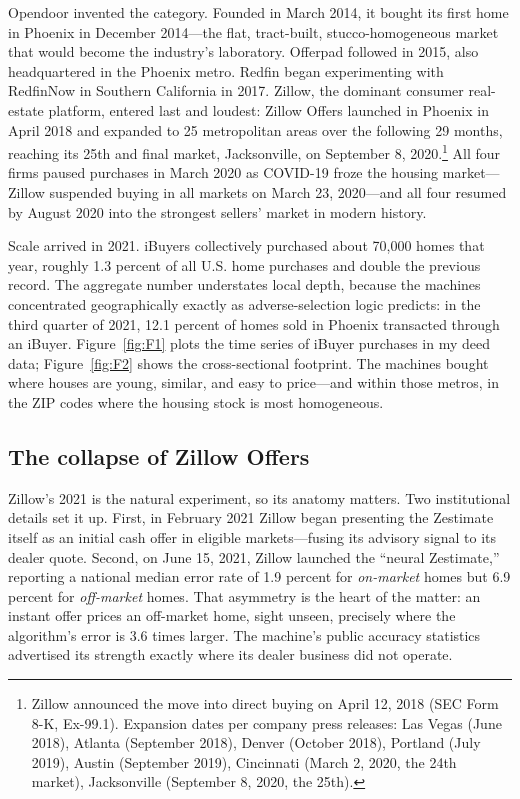 \documentclass[12pt, letterpaper]{article}
\theoremstyle{remark}
\begin{document}
Opendoor invented the category. Founded in March 2014, it bought its first home in Phoenix in December 2014---the flat, tract-built, stucco-homogeneous market that would become the industry's laboratory. Offerpad followed in 2015, also headquartered in the Phoenix metro. Redfin began experimenting with RedfinNow in Southern California in 2017. Zillow, the dominant consumer real-estate platform, entered last and loudest: Zillow Offers launched in Phoenix in April 2018 and expanded to 25 metropolitan areas over the following 29 months, reaching its 25th and final market, Jacksonville, on September 8, 2020.\footnote{Zillow announced the move into direct buying on April 12, 2018 (SEC Form 8-K, Ex-99.1). Expansion dates per company press releases: Las Vegas (June 2018), Atlanta (September 2018), Denver (October 2018), Portland (July 2019), Austin (September 2019), Cincinnati (March 2, 2020, the 24th market), Jacksonville (September 8, 2020, the 25th).} All four firms paused purchases in March 2020 as COVID-19 froze the housing market---Zillow suspended buying in all markets on March 23, 2020---and all four resumed by August 2020 into the strongest sellers' market in modern history.

Scale arrived in 2021. iBuyers collectively purchased about 70{,}000 homes that year, roughly 1.3 percent of all U.S. home purchases and double the previous record. The aggregate number understates local depth, because the machines concentrated geographically exactly as adverse-selection logic predicts: in the third quarter of 2021, 12.1 percent of homes sold in Phoenix transacted through an iBuyer. Figure~\ref{fig:F1} plots the time series of iBuyer purchases in my deed data; Figure~\ref{fig:F2} shows the cross-sectional footprint. The machines bought where houses are young, similar, and easy to price---and within those metros, in the ZIP codes where the housing stock is most homogeneous.

\subsection{The collapse of Zillow Offers}\label{sec:inst-collapse}

Zillow's 2021 is the natural experiment, so its anatomy matters. Two institutional details set it up. First, in February 2021 Zillow began presenting the Zestimate itself as an initial cash offer in eligible markets---fusing its advisory signal to its dealer quote. Second, on June 15, 2021, Zillow launched the ``neural Zestimate,'' reporting a national median error rate of 1.9 percent for \emph{on-market} homes but 6.9 percent for \emph{off-market} homes. That asymmetry is the heart of the matter: an instant offer prices an off-market home, sight unseen, precisely where the algorithm's error is 3.6 times larger. The machine's public accuracy statistics advertised its strength exactly where its dealer business did not operate.
\end{document}
